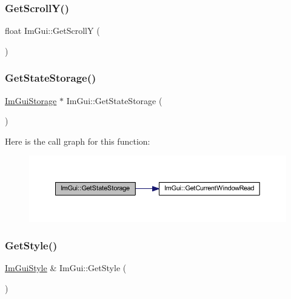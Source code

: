 \mbox{\label{namespace_im_gui_a3c924a2eeb8b2ddfb40ea17be7ea12a6}} 
\subsubsection{\texorpdfstring{Get\+Scroll\+Y()}{GetScrollY()}}
{\footnotesize\ttfamily float Im\+Gui\+::\+Get\+ScrollY (\begin{DoxyParamCaption}{ }\end{DoxyParamCaption})}

\mbox{\label{namespace_im_gui_aa2b8fa1a5320cd70f23a53d8fe604fb2}} 
\subsubsection{\texorpdfstring{Get\+State\+Storage()}{GetStateStorage()}}
{\footnotesize\ttfamily \mbox{\hyperlink{struct_im_gui_storage}{Im\+Gui\+Storage}} $\ast$ Im\+Gui\+::\+Get\+State\+Storage (\begin{DoxyParamCaption}{ }\end{DoxyParamCaption})}

Here is the call graph for this function\+:
\nopagebreak
\begin{figure}[H]
\begin{center}
\leavevmode
\includegraphics[width=350pt]{namespace_im_gui_aa2b8fa1a5320cd70f23a53d8fe604fb2_cgraph}
\end{center}
\end{figure}
\mbox{\label{namespace_im_gui_abafef4bb3e3654efd96a47b2e22870a7}} 
\subsubsection{\texorpdfstring{Get\+Style()}{GetStyle()}}
{\footnotesize\ttfamily \mbox{\hyperlink{struct_im_gui_style}{Im\+Gui\+Style}} \& Im\+Gui\+::\+Get\+Style (\begin{DoxyParamCaption}{ }\end{DoxyParamCaption})}

